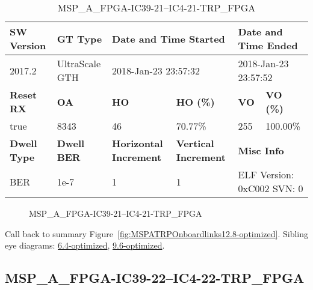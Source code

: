 \begin{table}[h]
\centering
\caption{MSP\_A\_FPGA-IC39-21--IC4-21-TRP\_FPGA}
\label{tab:MSPAFPGAIC3921IC421TRPFPGA12.8-optimized}
\begin{tabular}{@{}|l|l|l|l|l|l|@{}}
\toprule
\textbf{SW Version}                & \textbf{GT Type}   & \multicolumn{2}{l|}{\textbf{Date and Time Started}}            & \multicolumn{2}{l|}{\textbf{Date and Time Ended}}        \\ \midrule
2017.2                       & UltraScale GTH          & \multicolumn{2}{l|}{2018-Jan-23 23:57:32}                   & \multicolumn{2}{l|}{2018-Jan-23 23:57:52}               \\ \midrule
\textbf{Reset RX}                  & \textbf{OA} & \textbf{HO}   & \textbf{HO (\%)} & \textbf{VO} & \textbf{VO (\%)} \\ \midrule
true & 8343        & 46          & 70.77\%        & 255        & 100.00\%       \\ \midrule
\textbf{Dwell Type}                & \textbf{Dwell BER} & \textbf{Horizontal Increment} & \textbf{Vertical Increment}    & \multicolumn{2}{l|}{\textbf{Misc Info}}                  \\ \midrule
BER                            & 1e-7        & 1        & 1           & \multicolumn{2}{l|}{ELF Version: 0xC002 SVN: 0}                         \\ \bottomrule
\end{tabular}
\end{table}

\begin{figure}[h]
\caption{MSP\_A\_FPGA-IC39-21--IC4-21-TRP\_FPGA} \label{fig:MSPAFPGAIC3921IC421TRPFPGA12.8-optimized}
\end{figure}

Call back to summary Figure~\ref{fig:MSPATRPOnboardlinks12.8-optimized}.
Sibling eye diagrams: \hyperref[sec:MSPAFPGAIC3921IC421TRPFPGA6.4-optimized]{6.4-optimized}, \hyperref[sec:MSPAFPGAIC3921IC421TRPFPGA9.6-optimized]{9.6-optimized}.

\clearpage
\newpage


\subsection{MSP\_A\_FPGA-IC39-22--IC4-22-TRP\_FPGA}\label{sec:MSPAFPGAIC3922IC422TRPFPGA12.8-optimized}

